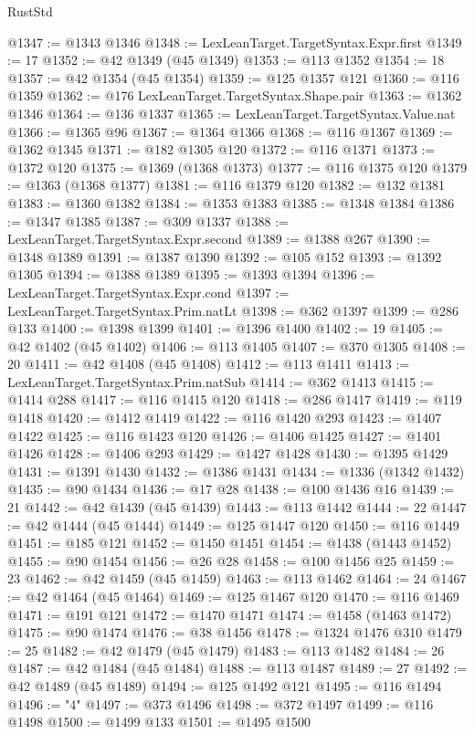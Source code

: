 \begin{lexlean}{RustStd}
\begin{coremodule}
@1347 := @1343 @1346
@1348 := LexLeanTarget.TargetSyntax.Expr.first
@1349 := 17
@1352 := @42 @1349 (@45 @1349)
@1353 := @113 @1352
@1354 := 18
@1357 := @42 @1354 (@45 @1354)
@1359 := @125 @1357 @121
@1360 := @116 @1359
@1362 := @176 LexLeanTarget.TargetSyntax.Shape.pair
@1363 := @1362 @1346
@1364 := @136 @1337
@1365 := LexLeanTarget.TargetSyntax.Value.nat
@1366 := @1365 @96
@1367 := @1364 @1366
@1368 := @116 @1367
@1369 := @1362 @1345
@1371 := @182 @1305 @120
@1372 := @116 @1371
@1373 := @1372 @120
@1375 := @1369 (@1368 @1373)
@1377 := @116 @1375 @120
@1379 := @1363 (@1368 @1377)
@1381 := @116 @1379 @120
@1382 := @132 @1381
@1383 := @1360 @1382
@1384 := @1353 @1383
@1385 := @1348 @1384
@1386 := @1347 @1385
@1387 := @309 @1337
@1388 := LexLeanTarget.TargetSyntax.Expr.second
@1389 := @1388 @267
@1390 := @1348 @1389
@1391 := @1387 @1390
@1392 := @105 @152
@1393 := @1392 @1305
@1394 := @1388 @1389
@1395 := @1393 @1394
@1396 := LexLeanTarget.TargetSyntax.Expr.cond
@1397 := LexLeanTarget.TargetSyntax.Prim.natLt
@1398 := @362 @1397
@1399 := @286 @133
@1400 := @1398 @1399
@1401 := @1396 @1400
@1402 := 19
@1405 := @42 @1402 (@45 @1402)
@1406 := @113 @1405
@1407 := @370 @1305
@1408 := 20
@1411 := @42 @1408 (@45 @1408)
@1412 := @113 @1411
@1413 := LexLeanTarget.TargetSyntax.Prim.natSub
@1414 := @362 @1413
@1415 := @1414 @288
@1417 := @116 @1415 @120
@1418 := @286 @1417
@1419 := @119 @1418
@1420 := @1412 @1419
@1422 := @116 @1420 @293
@1423 := @1407 @1422
@1425 := @116 @1423 @120
@1426 := @1406 @1425
@1427 := @1401 @1426
@1428 := @1406 @293
@1429 := @1427 @1428
@1430 := @1395 @1429
@1431 := @1391 @1430
@1432 := @1386 @1431
@1434 := @1336 (@1342 @1432)
@1435 := @90 @1434
@1436 := @17 @28
@1438 := @100 @1436 @16
@1439 := 21
@1442 := @42 @1439 (@45 @1439)
@1443 := @113 @1442
@1444 := 22
@1447 := @42 @1444 (@45 @1444)
@1449 := @125 @1447 @120
@1450 := @116 @1449
@1451 := @185 @121
@1452 := @1450 @1451
@1454 := @1438 (@1443 @1452)
@1455 := @90 @1454
@1456 := @26 @28
@1458 := @100 @1456 @25
@1459 := 23
@1462 := @42 @1459 (@45 @1459)
@1463 := @113 @1462
@1464 := 24
@1467 := @42 @1464 (@45 @1464)
@1469 := @125 @1467 @120
@1470 := @116 @1469
@1471 := @191 @121
@1472 := @1470 @1471
@1474 := @1458 (@1463 @1472)
@1475 := @90 @1474
@1476 := @38 @1456
@1478 := @1324 @1476 @310
@1479 := 25
@1482 := @42 @1479 (@45 @1479)
@1483 := @113 @1482
@1484 := 26
@1487 := @42 @1484 (@45 @1484)
@1488 := @113 @1487
@1489 := 27
@1492 := @42 @1489 (@45 @1489)
@1494 := @125 @1492 @121
@1495 := @116 @1494
@1496 := "4"
@1497 := @373 @1496
@1498 := @372 @1497
@1499 := @116 @1498
@1500 := @1499 @133
@1501 := @1495 @1500

\end{coremodule}
\end{lexlean}
